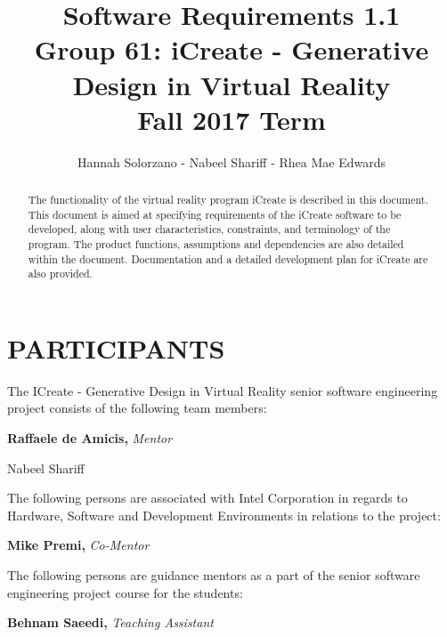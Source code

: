 \documentclass[letterpaper,draftclsnofoot,onecolumn,10 pt,compsoc]{IEEEtran}
\title{
  ~ \\ ~ \\ ~ \\ ~ \\ ~ \\
  Software Requirements 1.1 \\ \bigskip
  \large
  Group 61: iCreate - Generative Design in Virtual Reality \\
  Fall 2017 Term}
\author{Hannah Solorzano - Nabeel Shariff - Rhea Mae Edwards}
\begin{document}
\maketitle

\vfill

\begin{abstract}
\noindent
The functionality of the virtual reality program iCreate is described in this document. This document is aimed at specifying requirements of the iCreate software to be developed, along with user characteristics, constraints, and terminology of the program. The product functions, assumptions and dependencies are also detailed within the document. Documentation and a detailed development plan for iCreate are also provided.
\end{abstract}

\newpage

\section*{PARTICIPANTS}
The ICreate - Generative Design in Virtual Reality senior software engineering project consists of the following team members:
\bigskip

\noindent\leavevmode\rlap{}\hfill{\textbf{Raffaele de Amicis,} \textit{Mentor}}\hfill\llap{}\par
\noindent\leavevmode{}\hfill{Nabeel Shariff}\hfill{}\par

\bigskip
\noindent
The following persons are associated with Intel Corporation in regards to Hardware, Software and Development Environments in relations to the project:
\bigskip

\noindent\leavevmode\rlap{}\hfill{\textbf{Mike Premi,} \textit{Co-Mentor}}\hfill\llap{}\par

\bigskip
\noindent
The following persons are guidance mentors as a part of the senior software engineering project course for the students:
\bigskip

\noindent\leavevmode{}\hfill{\textbf{Behnam Saeedi,} \textit{Teaching Assistant}}\hfill{}\par
\newpage
\end{document}
